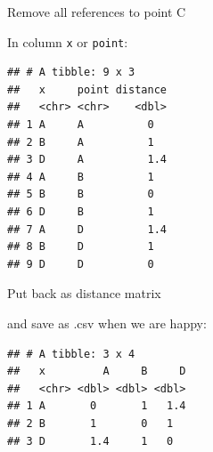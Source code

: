 \documentclass[ignorenonframetext,]{beamer}
\newenvironment{Shaded}{\begin{snugshade}}{\end{snugshade}}
\newcommand{\DecValTok}[1]{\textcolor[rgb]{0.00,0.00,0.81}{#1}}
\newcommand{\KeywordTok}[1]{\textcolor[rgb]{0.13,0.29,0.53}{\textbf{#1}}}
\newcommand{\NormalTok}[1]{#1}
\newcommand{\OperatorTok}[1]{\textcolor[rgb]{0.81,0.36,0.00}{\textbf{#1}}}
\newcommand{\StringTok}[1]{\textcolor[rgb]{0.31,0.60,0.02}{#1}}
\begin{document}
\begin{frame}[fragile]{Remove all references to point C}
\protect\hypertarget{remove-all-references-to-point-c}{}

In column \texttt{x} or \texttt{point}:

\begin{Shaded}
\end{Shaded}

\begin{verbatim}
## # A tibble: 9 x 3
##   x     point distance
##   <chr> <chr>    <dbl>
## 1 A     A          0  
## 2 B     A          1  
## 3 D     A          1.4
## 4 A     B          1  
## 5 B     B          0  
## 6 D     B          1  
## 7 A     D          1.4
## 8 B     D          1  
## 9 D     D          0
\end{verbatim}

\end{frame}

\begin{frame}[fragile]{Put back as distance matrix}
\protect\hypertarget{put-back-as-distance-matrix}{}

and save as .csv when we are happy:

\begin{Shaded}
\end{Shaded}

\begin{verbatim}
## # A tibble: 3 x 4
##   x         A     B     D
##   <chr> <dbl> <dbl> <dbl>
## 1 A       0       1   1.4
## 2 B       1       0   1  
## 3 D       1.4     1   0
\end{verbatim}

\begin{Shaded}
\end{Shaded}

\end{frame}
\end{document}

